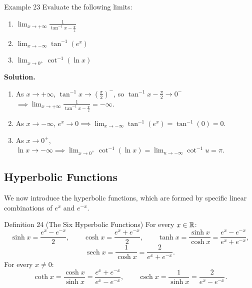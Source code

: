 \begin{examplebox}{Example 23}
Evaluate the following limits:
\begin{enumerate}
    \item \(\displaystyle\lim_{x \to +\infty} \frac{1}{\tan^{-1} x - \frac{\pi}{2}}\)
    \item \(\displaystyle\lim_{x \to -\infty} \tan^{-1}(e^x)\)
    \item \(\displaystyle\lim_{x \to 0^+} \cot^{-1}(\ln x)\)
\end{enumerate}

\medskip
\textbf{Solution.}
\begin{enumerate}
    \item As \(x \to +\infty\), \(\tan^{-1} x \to \left(\frac{\pi}{2}\right)^{\!-}\), so \(\tan^{-1} x - \frac{\pi}{2} \to 0^-\) \(\implies \displaystyle\lim_{x \to +\infty} \frac{1}{\tan^{-1} x - \frac{\pi}{2}} = -\infty\).
    \item As \(x \to -\infty\), \(e^x \to 0 \implies \displaystyle\lim_{x \to -\infty} \tan^{-1}(e^x) = \tan^{-1}(0) = 0\).
    \item As \(x \to 0^+\), \(\ln x \to -\infty \implies \displaystyle\lim_{x \to 0^+} \cot^{-1}(\ln x) = \lim_{u \to -\infty} \cot^{-1} u = \pi\).
\end{enumerate}
\end{examplebox}

\subsection*{Hyperbolic Functions}
\label{subsec:1.7.4}

We now introduce the hyperbolic functions, which are formed by specific linear combinations of \(e^x\) and \(e^{-x}\).

\begin{definitionbox}{Definition 24 (The Six Hyperbolic Functions)}
For every \(x \in \mathbb{R}\):
\[
\sinh x = \frac{e^x - e^{-x}}{2}, \qquad \cosh x = \frac{e^x + e^{-x}}{2}, \qquad \tanh x = \frac{\sinh x}{\cosh x} = \frac{e^x - e^{-x}}{e^x + e^{-x}},
\]
\[
\operatorname{sech} x = \frac{1}{\cosh x} = \frac{2}{e^x + e^{-x}}.
\]
For every \(x \neq 0\):
\[
\coth x = \frac{\cosh x}{\sinh x} = \frac{e^x + e^{-x}}{e^x - e^{-x}}, \qquad \operatorname{csch} x = \frac{1}{\sinh x} = \frac{2}{e^x - e^{-x}}.
\]
\end{definitionbox}

